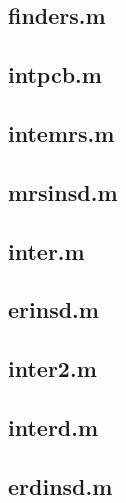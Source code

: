 \subsection{finders.m}
\label{sec:app9}



\subsection{intpcb.m}
\label{sec:app10}


\subsection{intemrs.m}
\label{sec:app11}


\subsection{mrsinsd.m}
\label{sec:app12}


\subsection{inter.m}
\label{sec:app13}


\subsection{erinsd.m}
\label{sec:app14}



\subsection{inter2.m}
\label{sec:app15}


\subsection{interd.m}
\label{sec:app16}


\subsection{erdinsd.m}
\label{sec:app17}


